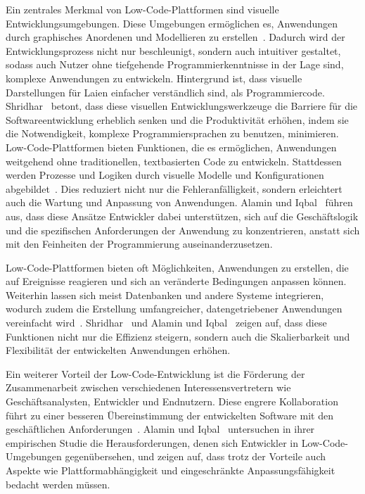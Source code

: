 Ein zentrales Merkmal von Low-Code-Plattformen sind visuelle Entwicklungsumgebungen. Diese Umgebungen ermöglichen 
es, Anwendungen durch graphisches Anordenen und Modellieren zu erstellen~\cite{Bock_2021}. Dadurch wird 
der Entwicklungsprozess nicht nur beschleunigt, sondern auch intuitiver gestaltet, sodass auch Nutzer ohne 
tiefgehende Programmierkenntnisse in der Lage sind, komplexe Anwendungen zu entwickeln. Hintergrund ist, dass 
visuelle Darstellungen für Laien einfacher verständlich sind, als Programmiercode. Shridhar~\cite{Shridhar_2021} betont, 
dass diese visuellen Entwicklungswerkzeuge die Barriere für die Softwareentwicklung erheblich senken und die 
Produktivität erhöhen, indem sie die Notwendigkeit, komplexe Programmiersprachen zu benutzen, minimieren.
Low-Code-Plattformen bieten Funktionen, die es ermöglichen, Anwendungen weitgehend ohne traditionellen, 
textbasierten Code zu entwickeln. Stattdessen werden Prozesse und Logiken durch visuelle Modelle und 
Konfigurationen abgebildet~\cite{Bock_2021}. Dies reduziert nicht nur die Fehleranfälligkeit, sondern 
erleichtert auch die Wartung und Anpassung von Anwendungen. Alamin und Iqbal~\cite{Alamin_2021} 
führen aus, dass diese Ansätze Entwickler dabei unterstützen, sich auf die Geschäftslogik und die spezifischen Anforderungen 
der Anwendung zu konzentrieren, anstatt sich mit den Feinheiten der Programmierung auseinanderzusetzen.

Low-Code-Plattformen bieten oft Möglichkeiten, Anwendungen zu erstellen, die auf Ereignisse reagieren und sich 
an veränderte Bedingungen anpassen können. Weiterhin lassen sich meist Datenbanken und andere Systeme integrieren, 
wodurch zudem die Erstellung umfangreicher, datengetriebener Anwendungen vereinfacht wird~\cite{Bock_2021}. 
Shridhar~\cite{Shridhar_2021} und Alamin und Iqbal~\cite{Alamin_2021} zeigen auf, dass diese 
Funktionen nicht nur die Effizienz steigern, sondern auch die Skalierbarkeit und Flexibilität 
der entwickelten Anwendungen erhöhen.

Ein weiterer Vorteil der Low-Code-Entwicklung ist die Förderung der Zusammenarbeit zwischen verschiedenen 
Interessensvertretern wie Geschäftsanalysten, Entwickler und Endnutzern. Diese engrere Kollaboration führt zu 
einer besseren Übereinstimmung der entwickelten Software mit den geschäftlichen Anforderungen~\cite{Shridhar_2021}. 
Alamin und Iqbal~\cite{Alamin_2021} untersuchen in ihrer empirischen 
Studie die Herausforderungen, denen sich Entwickler in Low-Code-Umgebungen gegenübersehen, und zeigen auf, dass trotz 
der Vorteile auch Aspekte wie Plattformabhängigkeit und eingeschränkte Anpassungsfähigkeit bedacht werden müssen.

